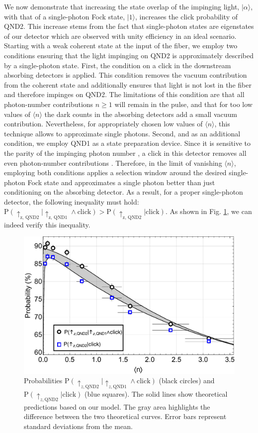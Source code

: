 \documentclass[prl,twocolumn,amsmath,amssymb,bibnotes,aps,longbibliography]{revtex4-1}
\newcommand{\ket}[1]{|{#1}\rangle}
\newcommand{\braket}[1]{\langle{#1}\rangle}
\begin{document}
We now demonstrate that increasing the state overlap of the impinging light, $\ket{\alpha}$, with that of a single-photon Fock state, $\ket{1}$, increases the click probability of QND2. This increase stems from the fact that single-photon states are eigenstates of our detector which are observed with unity efficiency in an ideal scenario. Starting with a weak coherent state at the input of the fiber, we employ two conditions ensuring that the light impinging on QND2 is approximately described by a single-photon state. First, the condition on a click in the downstream absorbing detectors is applied. This condition removes the vacuum contribution from the coherent state and additionally ensures that light is not lost in the fiber and therefore impinges on QND2. The limitations of this condition are that all photon-number contributions $n\ge1$ will remain in the pulse, and that for too low values of $\braket{n}$ the dark counts in the absorbing detectors add a small vacuum contribution. Nevertheless, for appropriately chosen low values of $\braket{n}$, this technique allows to approximate single photons. Second, and as an additional condition, we employ QND1 as a state preparation device. Since it is sensitive to the parity of the impinging photon number \cite{wang2005, hacker2019}, a click in this detector removes all even photon-number contributions \cite{daiss2019}. Therefore, in the limit of vanishing $\braket{n}$, employing both conditions applies a selection window around the desired single-photon Fock state and approximates a single photon better than just conditioning on the absorbing detector. As a result, for a proper single-photon detector, the following inequality must hold:  $\text{P}(\uparrow_{\text{z, QND2}}\vert\uparrow_{\text{z, QND1}}\land\text{click})>\text{P}(\uparrow_{\text{z, QND2}}\vert\text{click})$. 
As shown in Fig. \ref{fig:distillation}, we can indeed verify this inequality.
\begin{figure}[t]
\centering
\includegraphics[width=\columnwidth]{Fig4.pdf}
\caption{\label{fig:distillation}
Probabilities $\text{P}(\uparrow_{z, \text{QND}2}\vert \uparrow_{z,\text{QND}1}\land  \text{click})$ (black circles) and $\text{P}(\uparrow_{z, \text{QND}2}\vert \text{click})$ (blue squares).  The solid lines show theoretical predictions based on our model. The gray area highlights the difference between the two theoretical curves. Error bars represent standard deviations from the mean.
}
\end{figure}
\end{document}
